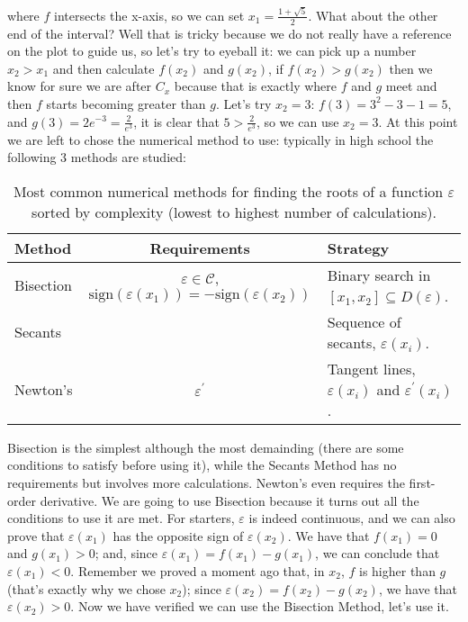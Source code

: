 where $f$ intersects the x-axis, so we can
set $x_1 = \frac{1 + \sqrt{5}}{2}$. What about the other end of the interval?
Well that is tricky because we do not really have a reference on the plot to
guide us, so let's try to
eyeball it: we can pick up a number $x_2 > x_1$ and then calculate $f(x_2)$ and
$g(x_2)$, if $f(x_2) > g(x_2)$ then we know for sure we are after $C_x$ because
that is exactly where $f$ and $g$ meet and then $f$ starts becoming
greater than $g$. Let's try $x_2 = 3$: $f(3) = 3^2 - 3 - 1 = 5$, and
$g(3) = 2e^{-3} = \frac{2}{e^3}$, it is clear that $5 > \frac{2}{e^3}$, so we
can use $x_2 = 3$. At this point we are left to chose the numerical method to use:
typically in high school the following 3 methods are studied:

\begin{table}[h]
    \begin{center}
        \footnotesize%
        \begin{tabular}{lcl}
        \toprule
        Method & Requirements & Strategy \\
        \midrule
        Bisection & $\varepsilon \in \mathcal{C}$, $\text{sign}(\varepsilon(x_1)) = -\text{sign}(\varepsilon(x_2))$ & Binary search
            in $[x_1, x_2] \subseteq D(\varepsilon)$.\\
        Secants & & Sequence of secants, $\varepsilon(x_i)$.\\
        Newton's & $\varepsilon^\prime$ & Tangent lines, $\varepsilon(x_i)$ and $\varepsilon^\prime(x_i)$.\\
        \bottomrule
        \end{tabular}
    \end{center}
    \caption{Most common numerical methods for finding the roots of a function $\varepsilon$ sorted by complexity
    (lowest to highest number of calculations).}
    \label{tab:nummethroots}
\end{table}

Bisection is the simplest although the most demainding (there are some conditions
to satisfy before using it), while the Secants Method has no requirements but involves more
calculations. Newton's even requires the first-order derivative. We are going to use Bisection
because it turns out all the conditions to use it are met.
For starters, $\varepsilon$ is indeed
continuous,
and we can also prove that $\varepsilon(x_1)$ has the
opposite sign of $\varepsilon(x_2)$. We have that $f(x_1) = 0$ and
$g(x_1) > 0$; and, since $\varepsilon(x_1) = f(x_1) - g(x_1)$, we
can conclude that $\varepsilon(x_1) < 0$. Remember we proved a moment ago that, in $x_2$,
$f$ is higher than $g$ (that's exactly why we chose $x_2$);
since $\varepsilon(x_2) = f(x_2) - g(x_2)$, we have that $\varepsilon(x_2) > 0$.
Now we have verified we can use the Bisection Method, let's use it.